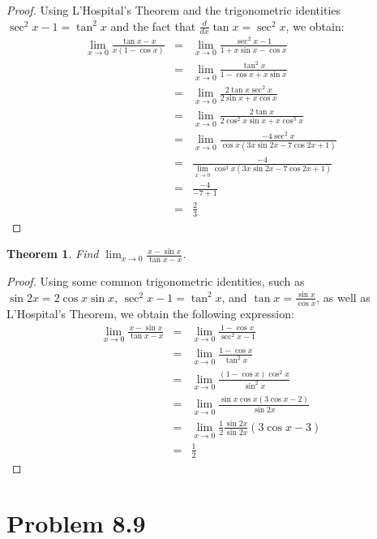\documentclass[psamsfonts]{amsart}
\newtheorem{thm}{Theorem}[section]
\theoremstyle{definition}
\theoremstyle{remark}
\numberwithin{equation}{section}
\begin{document}
\begin{proof}
Using L'Hospital's Theorem and the trigonometric identities $\sec^2 x - 1 = \tan^2 x$ and the fact that $\frac{d}{dx} \tan x = \sec^2 x$, we obtain:
\begin{eqnarray}
\lim_{x \to 0} \frac{\tan x - x}{x(1 - \cos x)} &=& \lim_{x \to 0} \frac{ \sec^2 x - 1}{1 + x \sin x - \cos x} \\
&=& \lim_{x \to 0} \frac{ \tan^2 x}{1 - \cos x + x \sin x} \\
&=& \lim_{x \to 0} \frac{ 2 \tan x \sec^2 x}{2 \sin x + x \cos x} \\
&=& \lim_{x \to 0} \frac{ 2 \tan x}{2 \cos^2 x \sin x + x \cos^3 x} \\
&=& \lim_{x \to 0} \frac{-4 \sec^2 x}{\cos x (3 x \sin 2x - 7 \cos 2x + 1)} \\
&=& \frac{-4}{ \lim_{x \to 0} \cos^3 x (3x \sin 2x - 7 \cos 2x + 1)} \\
&=& \frac{-4}{-7 + 1} \\
&=& \frac{2}{3}
\end{eqnarray}
\end{proof}

\begin{thm}
Find $\lim_{x \to 0} \frac{x - \sin x}{\tan x - x}$.
\end{thm}

\begin{proof}
Using some common trigonometric identities, such as $\sin 2x = 2 \cos x \sin x$, $\sec^2 x - 1 = \tan^2 x$, and $\tan x = \frac{\sin x}{\cos x}$, as well as L'Hospital's Theorem, we obtain the following expression:
\begin{eqnarray}
\lim_{x \to 0} \frac{ x - \sin x}{\tan x - x} &=& \lim_{x \to 0} \frac{1 - \cos x}{\sec^2 x - 1} \\
&=& \lim_{x \to 0} \frac{1 - \cos x}{\tan^2 x} \\
&=& \lim_{x \to 0} \frac{(1 - \cos x) \cos^2 x}{ \sin^2 x} \\
&=& \lim_{x \to 0} \frac{\sin x \cos x ( 3 \cos x - 2)}{\sin 2x} \\
&=& \lim_{x \to 0} \frac{1}{2} \frac{\sin 2x}{ \sin 2x} (3 \cos x - 3) \\
&=& \frac{1}{2} 
\end{eqnarray}
\end{proof}

\section{Problem 8.9}
\end{document}

